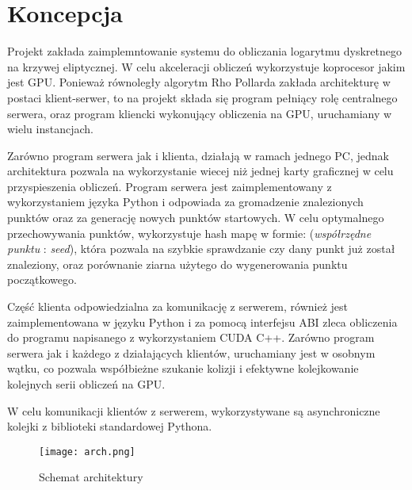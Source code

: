 \section{Koncepcja}
Projekt zakłada zaimplemntowanie systemu do obliczania logarytmu dyskretnego na krzywej eliptycznej.
W celu akceleracji obliczeń wykorzystuje koprocesor jakim jest GPU. Ponieważ równoległy algorytm Rho Pollarda
zakłada architekturę w postaci klient-serwer, to na projekt składa się program pełniący rolę centralnego serwera,
oraz program kliencki wykonujący obliczenia na GPU, uruchamiany w wielu instancjach.
\par
Zarówno program serwera jak i klienta, działają w ramach jednego PC, jednak architektura pozwala na wykorzystanie
wiecej niż jednej karty graficznej w celu przyspieszenia obliczeń.
Program serwera jest zaimplementowany z wykorzystaniem języka Python i odpowiada za gromadzenie znalezionych
punktów oraz za generację nowych punktów startowych. W celu optymalnego przechowywania punktów, wykorzystuje
hash mapę w formie: (\textit{współrzędne punktu} : \textit{seed}), która pozwala na szybkie sprawdzanie czy dany punkt już został znaleziony,
oraz porównanie ziarna użytego do wygenerowania punktu początkowego.
\par
Część klienta odpowiedzialna za komunikację z serwerem,
również jest zaimplementowana w języku Python i za pomocą interfejsu ABI zleca obliczenia do programu napisanego z wykorzystaniem
CUDA C++. Zarówno program serwera jak i każdego z działających klientów, uruchamiany jest w osobnym wątku, co pozwala współbieżne szukanie kolizji i efektywne
kolejkowanie kolejnych serii obliczeń na GPU.
\par
W celu komunikacji klientów z serwerem, wykorzystywane są asynchroniczne kolejki z biblioteki standardowej Pythona.
\begin{figure}[!h]
    \centering \texttt{[image: arch.png]}
    \caption{Schemat architektury}
\end{figure}